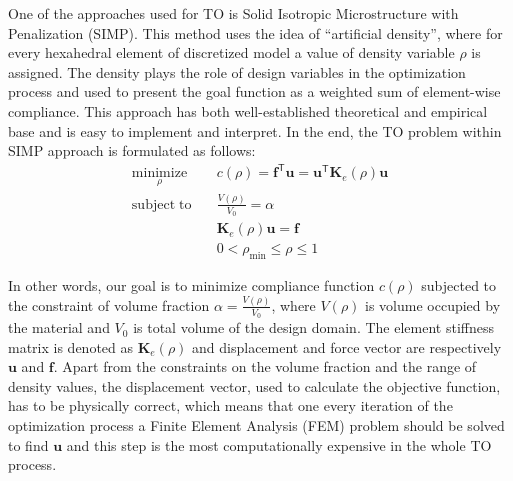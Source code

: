One of the approaches used for TO is Solid Isotropic Microstructure with Penalization (SIMP).
This method uses the idea of ``artificial density''\cite{to_simp}, where for every hexahedral element of discretized model a value of density variable $\rho$ is assigned.
The density plays the role of design variables in the optimization process and used to present the goal function as a weighted sum of element-wise compliance.
This approach has both well-established theoretical and empirical base and is easy to implement and interpret.
In the end, the TO problem within SIMP approach is formulated as follows:
	\begin{align*}
		\underset{\rho}{\mathrm{minimize}} \quad & c(\rho) = \mathbf{f}^{\mathsf{T}} \mathbf{u} = \mathbf{u}^{\mathsf{T}} \mathbf{K}_{e}(\rho) \mathbf{u} \\
		\mathrm{subject \; to} \quad & \frac{V(\rho)}{V_{0}} = \alpha \\
		& \mathbf{K}_{e}(\rho) \mathbf{u} = \mathbf{f} \\
		& 0 < \rho_{\min} \leq \rho \leq 1
	\end{align*} 

In other words, our goal is to minimize compliance function $c(\rho)$ subjected to the constraint of volume fraction $\alpha = \frac{V(\rho)}{V_{0}}$, where $V(\rho)$ is volume occupied by the material and $ V_{0} $ is total volume of the design domain.
The element stiffness matrix is denoted as $\mathbf{K}_{e}(\rho)$ and displacement and force vector are respectively $\mathbf{u}$ and $\mathbf{f}$.
Apart from the constraints on the volume fraction and the range of density values, the displacement vector, used to calculate the objective function, has to be physically correct, which means that one every iteration of the optimization process a Finite Element Analysis (FEM) problem should be solved to find $\mathbf{u}$ and this step is the most computationally expensive in the whole TO process.
\medskip

